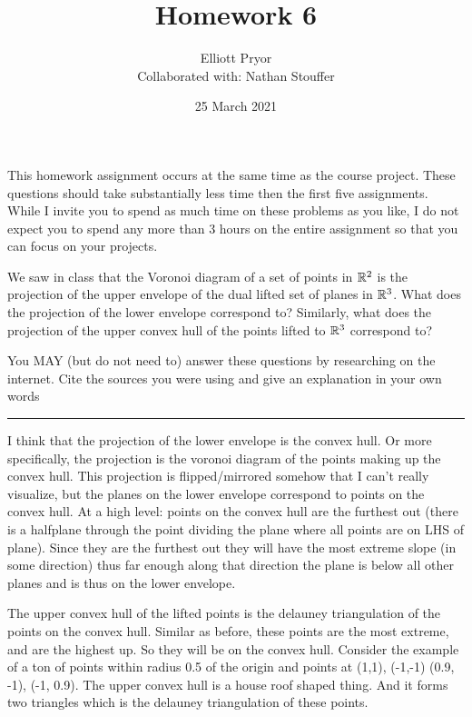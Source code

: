 \documentclass[11pt]{article}
\title{Homework 6}
\author{Elliott Pryor \\
Collaborated with: Nathan Stouffer}
\date{25 March 2021}
\begin{document}
\maketitle

This homework assignment occurs at the same time as the course project.  These
questions should take substantially less time then the first five assignments.
While I invite you to spend as much time on these problems as you like, I do not
expect you to spend any more than 3 hours on the entire assignment so that you
can focus on your projects.



We saw in class that the Voronoi diagram of a set of points in $\mathbb{R}^2$ is the
projection of the upper envelope of the dual lifted set of planes in $\mathbb{R}^3$.
What does the projection of the lower envelope correspond to? Similarly, what
does the projection of the upper convex hull of the points lifted to $\mathbb{R}^3$
correspond to?

You MAY (but do not need to) answer these questions by researching on the
internet. Cite the sources you were using and give an explanation in your own
words

\hrule

I think that the projection of the lower envelope is the convex hull.
Or more specifically, the projection is the voronoi diagram of the points making up the convex hull.
This projection is flipped/mirrored somehow that I can't really visualize, but the 
planes on the lower envelope correspond to points on the convex hull.
At a high level: points on the convex hull are the furthest out (there is a halfplane through
the point dividing the plane where all points are on LHS of plane). 
Since they are the furthest out they will have the most extreme slope (in some direction)
thus far enough along that direction the plane is below all other planes and is thus on the lower envelope.



The upper convex hull of the lifted points is the delauney triangulation of the points
on the convex hull. Similar as before, these points are the most extreme, and are the highest up. 
So they will be on the convex hull. 
Consider the example of a ton of points within radius 0.5 of the origin and points at (1,1), (-1,-1)
(0.9, -1), (-1, 0.9). The upper convex hull is a house roof shaped thing. And it forms
two triangles which is the delauney triangulation of these points.
\end{document}
